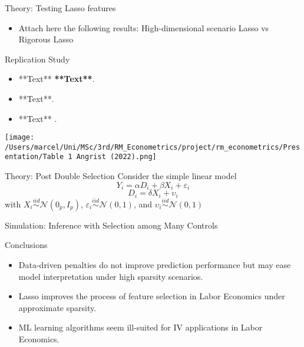 \documentclass{beamer}
\begin{document}
\begin{frame}{Theory: Testing Lasso features}
	\begin{itemize}
		\item Attach here the following results: High-dimensional scenario Lasso vs Rigorous Lasso
	\end{itemize}
\end{frame}


\begin{frame}{Replication Study}
\begin{itemize}
  
\item **Text** \textbf{**Text**}.
\item **Text**. 
\item **Text** .
\end{itemize}

\texttt{[image: /Users/marcel/Uni/MSc/3rd/RM\_Econometrics/project/rm\_econometrics/Presentation/Table 1 Angrist (2022).png]}
\end{frame}

\begin{frame}{Theory: Post Double Selection}
Consider the simple linear model
\[Y_i = \alpha D_i + \beta X_i + \varepsilon_i\]
\[D_i = \delta X_i + \upsilon_i\]
with \(X_i \stackrel{iid}{\sim} \mathcal{N}(0_p,I_p)\), \(\varepsilon_i \stackrel{iid}{\sim} \mathcal{N}(0,1)\), and \(\upsilon_i \stackrel{iid}{\sim} \mathcal{N}(0,1)\) 
\end{frame}

\begin{frame}{Simulation: Inference with Selection among Many Controls}
	
\end{frame}



\begin{frame} {Conclusions}
\begin{itemize}
\item Data-driven penalties do not improve prediction performance but may ease model interpretation under high sparsity scenarios.
\item Lasso improves the process of feature selection in Labor Economics under approximate sparsity.  
\item ML learning algorithms seem  ill-suited for IV applications in Labor Economics.
\end{itemize}
\end{frame}
\end{document}
